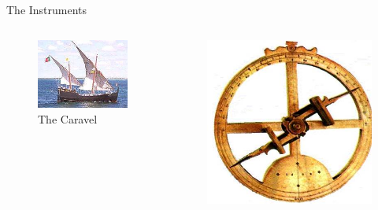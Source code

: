 \documentclass{beamer}
\begin{document}
\begin{frame}{The Instruments}
\begin{columns}
	\begin{figure}[ht]
	\begin{center}
	\includegraphics[width=0.9 \columnwidth]{Caravel.jpg}
	\caption{\tiny The Caravel}
	\end{center}
	\end{figure}
	\begin{figure}[ht]
	\begin{center}
	\includegraphics[width=0.9 \columnwidth]{Astrolab.jpg}

\end{center}
\end{figure}
\end{columns}
\end{frame}
\end{document}
